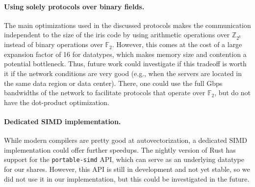 \documentclass[a4paper,11pt,
]{article}
\newcommand{\F}{\ensuremath{\mathbb{F}}\xspace}
\newcommand{\Z}{\ensuremath{\mathbb{Z}}\xspace}
\begin{document}
\paragraph{Using solely protocols over binary fields.}
The main optimizations used in the discussed protocols makes the communication independent to the size of the iris code by using arithmetic operations over $\Z_{2^k}$ instead of binary operations over $\F_2$. However, this comes at the cost of a large expansion factor of 16 for datatypes, which makes memory size and contention a potential bottleneck. Thus, future work could investigate if this tradeoff is worth it if the network conditions are very good (e.g., when the servers are located in the same data region or data center). There, one could use the full Gbps bandwidths of the network to facilitate protocols that operate over $\F_2$, but do not have the dot-product optimization.

\paragraph{Dedicated SIMD implementation.}
While modern compilers are pretty good at autovectorization, a dedicated SIMD implementation could offer further speedups. The nightly version of Rust has support for the \texttt{portable-simd} API, which can serve as an underlying datatype for our shares. However, this API is still in development and not yet stable, so we did not use it in our implementation, but this could be investigated in the future.

\printbibliography
\end{document}
